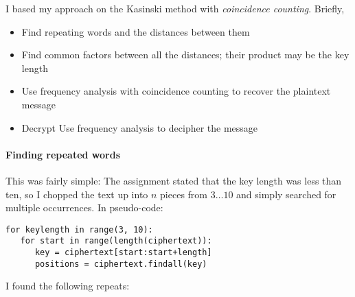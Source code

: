 \documentclass[a4paper,english,12pt]{article}
\begin{document}
I based my approach on the Kasinski method with \textit{coincidence
counting}\cite{coincidence.friedman}. Briefly,

\begin{itemize}
  \item Find repeating words and the distances between them
  \item Find common factors between all the distances; their product may be the
    key length
  \item Use frequency analysis with coincidence counting to recover the
    plaintext message
  \item Decrypt Use frequency analysis to decipher the message
\end{itemize}

\paragraph{Finding repeated words}

This was fairly simple: The assignment stated that the key length was less than
ten, so I chopped the text up into $n$ pieces from $3\dots10$ and simply
searched for multiple occurrences. In pseudo-code:

\begin{verbatim}
for keylength in range(3, 10):
   for start in range(length(ciphertext)):
      key = ciphertext[start:start+length]
      positions = ciphertext.findall(key)
\end{verbatim}

I found the following repeats:
\end{document}
